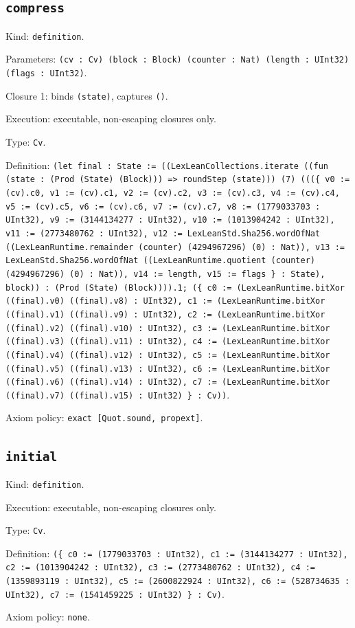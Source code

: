 \documentclass[11pt]{article}
\begin{document}
\subsection*{\texttt{compress}}
\noindent Kind: \texttt{definition}.\par
\noindent Parameters: \texttt{(cv : Cv) (block : Block) (counter : Nat) (length : UInt32) (flags : UInt32)}.\par
\noindent Closure 1: binds \texttt{(state)}, captures \texttt{()}.\par
\noindent Execution: executable, non-escaping closures only.\par
\noindent Type: \texttt{Cv}.\par
\noindent Definition: \texttt{(let final : State := ((LexLeanCollections.iterate ((fun (state : (Prod (State) (Block))) => roundStep (state))) (7) (((\{ v0 := (cv).c0, v1 := (cv).c1, v2 := (cv).c2, v3 := (cv).c3, v4 := (cv).c4, v5 := (cv).c5, v6 := (cv).c6, v7 := (cv).c7, v8 := (1779033703 : UInt32), v9 := (3144134277 : UInt32), v10 := (1013904242 : UInt32), v11 := (2773480762 : UInt32), v12 := LexLeanStd.Sha256.wordOfNat ((LexLeanRuntime.remainder (counter) (4294967296) (0) : Nat)), v13 := LexLeanStd.Sha256.wordOfNat ((LexLeanRuntime.quotient (counter) (4294967296) (0) : Nat)), v14 := length, v15 := flags \} : State), block)) : (Prod (State) (Block)))).1; (\{ c0 := (LexLeanRuntime.bitXor ((final).v0) ((final).v8) : UInt32), c1 := (LexLeanRuntime.bitXor ((final).v1) ((final).v9) : UInt32), c2 := (LexLeanRuntime.bitXor ((final).v2) ((final).v10) : UInt32), c3 := (LexLeanRuntime.bitXor ((final).v3) ((final).v11) : UInt32), c4 := (LexLeanRuntime.bitXor ((final).v4) ((final).v12) : UInt32), c5 := (LexLeanRuntime.bitXor ((final).v5) ((final).v13) : UInt32), c6 := (LexLeanRuntime.bitXor ((final).v6) ((final).v14) : UInt32), c7 := (LexLeanRuntime.bitXor ((final).v7) ((final).v15) : UInt32) \} : Cv))}.\par
\noindent Axiom policy: \texttt{exact [Quot.sound, propext]}.\par
\subsection*{\texttt{initial}}
\noindent Kind: \texttt{definition}.\par
\noindent Execution: executable, non-escaping closures only.\par
\noindent Type: \texttt{Cv}.\par
\noindent Definition: \texttt{(\{ c0 := (1779033703 : UInt32), c1 := (3144134277 : UInt32), c2 := (1013904242 : UInt32), c3 := (2773480762 : UInt32), c4 := (1359893119 : UInt32), c5 := (2600822924 : UInt32), c6 := (528734635 : UInt32), c7 := (1541459225 : UInt32) \} : Cv)}.\par
\noindent Axiom policy: \texttt{none}.\par
\end{document}
